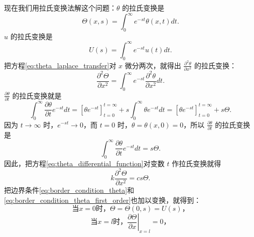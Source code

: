 现在我们用拉氏变换法解这个问题：$\theta$ 的拉氏变换是
\begin{equation}\label{eq:theta_laplace_transfer}
\Theta(x,s) = \int_0^\infty e^{-st}\theta(x,t)dt.
\end{equation}
$u$ 的拉氏变换是
\begin{equation*}
U(s) = \int_0^\infty e^{-st}u(t)dt.
\end{equation*}
把方程\eqref{eq:theta_laplace_transfer}对 $x$ 微分两次，就得出 $\frac{\partial^2 \theta}{\partial x^2}$ 的拉氏变换：
\begin{equation}
\frac{\partial^2 \Theta}{\partial x^2} = \int_0^\infty e^{-st} \frac{\partial^2 \theta}{\partial x^2} dt.
\end{equation}
$\frac{\partial \theta}{\partial t}$ 的拉氏变换就是
\begin{equation*}
\int_0^\infty \frac{\partial \theta}{\partial t} e^{-st} dt = [\theta e^{-st}]_{t=0}^{t=\infty} + s \int_0^\infty \theta e^{-st} dt = [\theta e^{-st}]_{t=0}^{t=\infty} + s \Theta.
\end{equation*}
因为 $t \to \infty$ 时，$e^{-st} \to 0$，而 $t=0$ 时，$\theta = \theta(x,0) = 0$，所以 $\frac{\partial \theta}{\partial t}$ 的拉氏变换是
\begin{equation}
\int_0^\infty \frac{\partial \theta}{\partial t} e^{-st} dt = s \Theta.
\end{equation}
因此，把方程\eqref{eq:theta_differential_function}对变数 $t$ 作拉氏变换就得
\begin{equation}\label{eq:theta_differential_function_t_laplace}
k \frac{\partial^2 \Theta}{\partial x^2} = cs \Theta.
\end{equation}
把边界条件\eqref{eq:border_condition_theta}和\eqref{eq:border_condition_theta_first_order}也加以变换，就得到：
\begin{equation}\label{eq:theta_x_0}
\mbox{当} x = 0 \mbox{时}，\Theta = \Theta(0,s) = U(s)，
\end{equation}
\begin{equation}\label{eq:theta_x_l}
\mbox{当} x = l \mbox{时}，\left.\frac{\partial \Theta}{\partial x}\right|_{x=l} = 0，
\end{equation}


